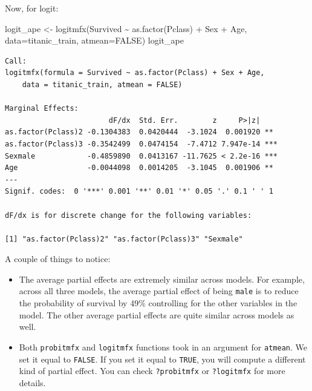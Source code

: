 \documentclass[
  letterpaper,
  DIV=11,
  numbers=noendperiod]{scrreprt}
\newenvironment{Shaded}{\begin{snugshade}}{\end{snugshade}}
\newcommand{\AttributeTok}[1]{\textcolor[rgb]{0.40,0.45,0.13}{#1}}
\newcommand{\ConstantTok}[1]{\textcolor[rgb]{0.56,0.35,0.01}{#1}}
\newcommand{\FunctionTok}[1]{\textcolor[rgb]{0.28,0.35,0.67}{#1}}
\newcommand{\NormalTok}[1]{\textcolor[rgb]{0.00,0.23,0.31}{#1}}
\newcommand{\OtherTok}[1]{\textcolor[rgb]{0.00,0.23,0.31}{#1}}
\newcommand{\SpecialCharTok}[1]{\textcolor[rgb]{0.37,0.37,0.37}{#1}}
\begin{document}
Now, for logit:

\begin{Shaded}
\begin{Highlighting}[]
\NormalTok{logit\_ape }\OtherTok{\textless{}{-}} \FunctionTok{logitmfx}\NormalTok{(Survived }\SpecialCharTok{\textasciitilde{}} \FunctionTok{as.factor}\NormalTok{(Pclass) }\SpecialCharTok{+}\NormalTok{ Sex }\SpecialCharTok{+}\NormalTok{ Age, }
                        \AttributeTok{data=}\NormalTok{titanic\_train, }
                        \AttributeTok{atmean=}\ConstantTok{FALSE}\NormalTok{)}
\NormalTok{logit\_ape}
\end{Highlighting}
\end{Shaded}

\begin{verbatim}
Call:
logitmfx(formula = Survived ~ as.factor(Pclass) + Sex + Age, 
    data = titanic_train, atmean = FALSE)

Marginal Effects:
                        dF/dx  Std. Err.        z     P>|z|    
as.factor(Pclass)2 -0.1304383  0.0420444  -3.1024  0.001920 ** 
as.factor(Pclass)3 -0.3542499  0.0474154  -7.4712 7.947e-14 ***
Sexmale            -0.4859890  0.0413167 -11.7625 < 2.2e-16 ***
Age                -0.0044098  0.0014205  -3.1045  0.001906 ** 
---
Signif. codes:  0 '***' 0.001 '**' 0.01 '*' 0.05 '.' 0.1 ' ' 1

dF/dx is for discrete change for the following variables:

[1] "as.factor(Pclass)2" "as.factor(Pclass)3" "Sexmale"           
\end{verbatim}

A couple of things to notice:

\begin{itemize}
\item
  The average partial effects are extremely similar across models. For
  example, across all three models, the average partial effect of being
  \texttt{male} is to reduce the probability of survival by 49\%
  controlling for the other variables in the model. The other average
  partial effects are quite similar across models as well.
\item
  Both \texttt{probitmfx} and \texttt{logitmfx} functions took in an
  argument for \texttt{atmean}. We set it equal to \texttt{FALSE}. If
  you set it equal to \texttt{TRUE}, you will compute a different kind
  of partial effect. You can check \texttt{?probitmfx} or
  \texttt{?logitmfx} for more details.
\end{itemize}
\end{document}
